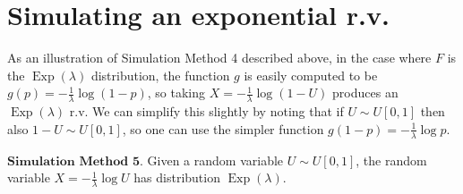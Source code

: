 \section{Simulating an exponential r.v.}

As an illustration of Simulation Method 4 described
above, in the case where $F$ is the
$\operatorname{Exp}(\lambda)$ distribution, the
function $g$ is easily computed to be
$g(p)=-\frac{1}{\lambda} \log(1-p)$, so taking
$X=-\frac{1}{\lambda} \log (1-U)$ produces an
$\operatorname{Exp}(\lambda)$ r.v. We can simplify
this slightly by noting that if $U\sim U[0,1]$ then
also $1-U \sim U[0,1]$, so one can use the simpler
function $g(1-p)=-\frac{1}{\lambda}\log p$.

$\textbf{Simulation Method 5.}$ Given a random
variable $U\sim U[0,1]$, the random variable
$X = -\frac{1}{\lambda}\log U$ has distribution
$\operatorname{Exp}(\lambda)$.
